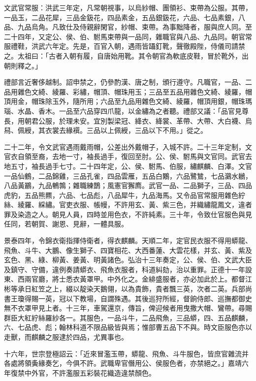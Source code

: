 文武官常服：洪武三年定，凡常朝視事，以烏紗帽、團領衫、束帶為公服。其帶，一品玉，二品花犀，三品金鈒花，四品素金，五品銀鈒花，六品、七品素銀，八品、九品烏角。凡致仕及侍親辭閑官，紗帽、束帶。為事黜降者，服與庶人同。至二十四年，又定公、侯、伯、駙馬束帶與一品同，雜職官與八品、九品同。朝官常服禮鞋，洪武六年定。先是，百官入朝，遇雨皆躡釘靴，聲徹殿陛，侍儀司請禁之。太祖曰：「古者入朝有履，自唐始用靴。其令朝官為軟底皮鞋，冒於靴外，出朝則釋之。」

禮部言近奢侈越制。詔申禁之，仍參酌漢、唐之制，頒行遵守。凡職官，一品、二品用雜色文綺、綾羅、彩繡，帽頂、帽珠用玉；三品至五品用雜色文綺、綾羅，帽頂用金，帽珠除玉外，隨所用；六品至九品用雜色文綺、綾羅，帽頂用銀，帽珠瑪瑙、水晶、香木。一品至六品穿四爪龍，以金繡為之者聽。禮部又議：「品官見尊長，用朝君公服，於理未安。宜別製梁冠、絳衣、絳裳、革帶、大帶、大白襪、烏舄、佩綬，其衣裳去緣襈。三品以上佩綬，三品以下不用。」從之。

二十二年，令文武官遇雨戴雨帽，公差出外戴帽子，入城不許。二十三年定制，文官衣自領至裔，去地一寸，袖長過手，復回至肘。公、侯、駙馬與文官同。武官去地五寸，袖長過手七寸。二十四年定，公、侯、駙馬、伯服，繡麒麟、白澤。文官一品仙鶴，二品錦雞，三品孔雀，四品雲雁，五品白鷴，六品鷺鷥，七品鸂水鶒，八品黃鸝，九品鵪鶉；雜職練鵲；風憲官獬廌。武官一品、二品獅子，三品、四品虎豹，五品熊羆，六品、七品彪，八品犀牛，九品海馬。又令品官常服用雜色紵絲、綾羅、綵繡。官吏衣服、帳幔，不許用玄、黃、紫三色，并織繡龍鳳文，違者罪及染造之人。朝見人員，四時並用色衣，不許純素。三十年，令致仕官服色與見任同，若朝賀、謝恩、見辭，一體具服。

景泰四年，令錦衣衛指揮侍衛者，得衣麒麟。天順二年，定官民衣服不得用蟒龍、飛魚、斗牛、大鵬、像生獅子、四寶相花、大西番蓮、大雲花樣，并玄、黃、紫及玄色、黑、綠、柳黃、姜黃、明黃諸色。弘治十三年奏定，公、侯、伯、文武大臣及鎮守、守備，違例奏請蟒衣、飛魚衣服者，科道糾劾，治以重罪。正德十一年設東、西兩官廳，將士悉衣黃罩甲。中外化之。金緋盛服者，亦必加此於上。都督江彬等承日紅笠之上，綴以靛染天鵝翎，以為貴飾，貴者飄三英，次者二英。兵部尚書王瓊得賜一英，冠以下教場，自謂殊遇。其後巡狩所經，督餉侍郎、巡撫都御史無不衣罩甲見上者。十三年，車駕還京，傳旨，俾迎候者用曳撒大帽、鸞帶。尋賜群臣大紅紵絲羅紗各一。其服色，一品斗牛，二品飛魚，三品蟒，四、五品麒麟，六、七品虎、彪；翰林科道不限品級皆與焉；惟部曹五品下不與。時文臣服色亦以走獸，而麒麟之服逮於四品，尤異事也。

十六年，世宗登極詔云：「近來冒濫玉帶，蟒龍、飛魚、斗牛服色，皆庶官雜流并各處將領夤緣奏乞，今俱不許。武職卑官僭用公、侯服色者，亦禁絕之。」嘉靖六年復禁中外官，不許濫服五彩裝花織造違禁顏色。

